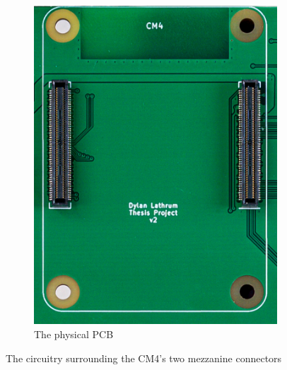 \begin{figure}[b!]
\begin{subfigure}{.33\textwidth}
    \includegraphics[width=.95\linewidth]{Figures/pcb/crops/cm4}
    \caption{The physical PCB}
    \label{fig:CM4CircuitReal}
  \end{subfigure}
  \caption[PCB CM4 Circuit]{The circuitry surrounding the CM4's two mezzanine connectors}
  \label{fig:CM4Circuit}
\end{figure}

